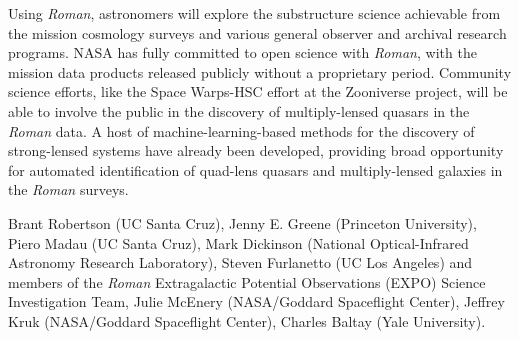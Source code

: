\documentclass[11pt]{article}
\newcommand{\RST}{\emph{Roman}\xspace}
\begin{document}
Using \RST, astronomers
will explore the substructure science achievable from the mission cosmology surveys and various 
general observer and archival research programs. NASA has fully committed to open science with
\RST, with the mission data products released publicly without a proprietary period.
Community science efforts, like the Space Warps-HSC effort at the Zooniverse project\cite{verma2020a},
will be able to involve the public in the discovery of multiply-lensed quasars in the \RST data.
A host of machine-learning-based methods for the discovery of strong-lensed systems have already
been developed\citep{petrillo2019a,madireddy2019a,cheng2020a,canameras2020a}, providing broad
opportunity for automated identification of quad-lens quasars and multiply-lensed galaxies in
the \RST surveys.

\clearpage

\noindent %


\def\apj{\it{ApJ}}                  
\def\apjl{\it{ApJL}}
\def\araa{\it{ARAA}}
\def\baas{\it{BAAS}}
\def\mnras{\it{MNRAS}}
\def\nat{\it{Nature}}
\def\prd{\it{Phys. Rev. D}}
\def\prl{\it{Phys. Rev. Lett.}}





\vspace{4in}


Brant Robertson (UC Santa Cruz),
Jenny E. Greene (Princeton University),
Piero Madau (UC Santa Cruz), Mark Dickinson (National Optical-Infrared Astronomy Research Laboratory), Steven Furlanetto (UC Los Angeles) and members of the \RST Extragalactic Potential Observations (EXPO) Science Investigation Team, Julie McEnery (NASA/Goddard Spaceflight Center), Jeffrey Kruk (NASA/Goddard Spaceflight Center), Charles Baltay (Yale University).
\end{document}
